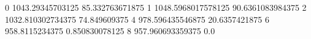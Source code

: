 0 1043.29345703125 85.332763671875
1 1048.5968017578125 90.6361083984375
2 1032.810302734375 74.849609375
4 978.596435546875 20.6357421875
6 958.8115234375 0.850830078125
8 957.960693359375 0.0
